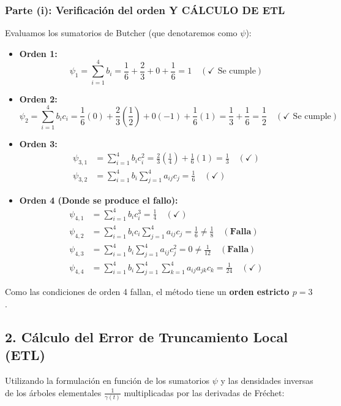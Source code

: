 \begin{sol}
    
\subsubsection*{Parte (i): Verificación del orden Y C\'ALCULO DE ETL}
Evaluamos los sumatorios de Butcher (que denotaremos como $\psi$):

\begin{itemize}
    \item \textbf{Orden 1:} 
    \[
    \psi_1 = \sum_{i=1}^4 b_i = \frac{1}{6} + \frac{2}{3} + 0 + \frac{1}{6} = 1 \quad (\checkmark \text{ Se cumple})
    \]
    \item \textbf{Orden 2:} 
    \[
    \psi_2 = \sum_{i=1}^4 b_i c_i = \frac{1}{6}(0) + \frac{2}{3}\left(\frac{1}{2}\right) + 0(-1) + \frac{1}{6}(1) = \frac{1}{3} + \frac{1}{6} = \frac{1}{2} \quad (\checkmark \text{ Se cumple})
    \]
    \item \textbf{Orden 3:} 
    \begin{align*}
        \psi_{3,1} &= \sum_{i=1}^4 b_i c_i^2 = \frac{2}{3}\left(\frac{1}{4}\right) + \frac{1}{6}(1) = \frac{1}{3} \quad (\checkmark) \\
        \psi_{3,2} &= \sum_{i=1}^4 b_i \sum_{j=1}^4 a_{ij} c_j = \frac{1}{6} \quad (\checkmark)
    \end{align*}
    \item \textbf{Orden 4 (Donde se produce el fallo):}
    \begin{align*}
        \psi_{4,1} &= \sum_{i=1}^4 b_i c_i^3 = \frac{1}{4} \quad (\checkmark) \\
        \psi_{4,2} &= \sum_{i=1}^4 b_i c_i \sum_{j=1}^4 a_{ij} c_j = \frac{1}{6} \neq \frac{1}{8} \quad (\mathbf{\text{Falla}}) \\
        \psi_{4,3} &= \sum_{i=1}^4 b_i \sum_{j=1}^4 a_{ij} c_j^2 = 0 \neq \frac{1}{12} \quad (\mathbf{\text{Falla}}) \\
        \psi_{4,4} &= \sum_{i=1}^4 b_i \sum_{j=1}^4 \sum_{k=1}^4 a_{ij} a_{jk} c_k = \frac{1}{24} \quad (\checkmark)
    \end{align*}
\end{itemize}

Como las condiciones de orden 4 fallan, el método tiene un \textbf{orden estricto $p = 3$}.

\subsection*{2. Cálculo del Error de Truncamiento Local (ETL)}
Utilizando la formulación en función de los sumatorios $\psi$ y las densidades inversas de los árboles elementales $\frac{1}{\gamma(t)}$ multiplicadas por las derivadas de Fréchet:


\end{sol}

